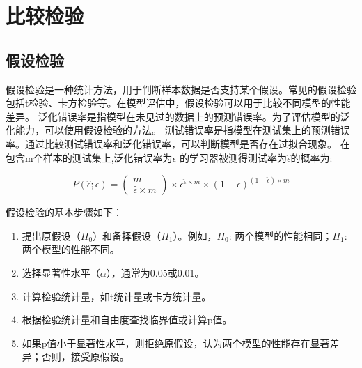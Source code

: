 \section{比较检验}
\subsection{假设检验}
假设检验是一种统计方法，用于判断样本数据是否支持某个假设。常见的假设检验包括t检验、卡方检验等。在模型评估中，假设检验可以用于比较不同模型的性能差异。
泛化错误率是指模型在未见过的数据上的预测错误率。为了评估模型的泛化能力，可以使用假设检验的方法。
测试错误率是指模型在测试集上的预测错误率。通过比较测试错误率和泛化错误率，可以判断模型是否存在过拟合现象。
在包含m个样本的测试集上,泛化错误率为$\epsilon$ 的学习器被测得测试率为$\hat{\epsilon}$的概率为:

\begin{equation}
    P(\hat{\epsilon};\epsilon) =
    \begin{pmatrix}
        m \\
        \hat{\epsilon}\times m
    \end{pmatrix}
    \times
    \epsilon^{\hat{\epsilon} \times m} \times (1-\epsilon)^{(1-\hat{\epsilon}) \times m}
\end{equation}

假设检验的基本步骤如下：
\begin{enumerate}
    \item 提出原假设（$H_0$）和备择假设（$H_1$）。例如，$H_0$: 两个模型的性能相同；$H_1$: 两个模型的性能不同。
    \item 选择显著性水平（$\alpha$），通常为0.05或0.01。
    \item 计算检验统计量，如t统计量或卡方统计量。
    \item 根据检验统计量和自由度查找临界值或计算p值。
    \item 如果p值小于显著性水平，则拒绝原假设，认为两个模型的性能存在显著差异；否则，接受原假设。
\end{enumerate}

